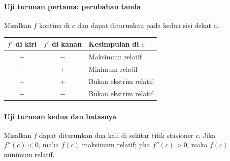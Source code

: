 \documentclass{../../kalkulus-ppt}
\begin{document}
\begin{frame}
\frametitle{\insertsection}
\framesubtitle{Uji turunan pertama: perubahan tanda}

\begin{teorema}
Misalkan $f$ kontinu di $c$ dan dapat diturunkan pada kedua sisi dekat $c$.
\begin{center}\begin{tabular}{c|c|l}
$f'$ di kiri&$f'$ di kanan&Kesimpulan di $c$\\\hline
$+$&$-$&Maksimum relatif\\
$-$&$+$&Minimum relatif\\
$+$&$+$&Bukan ekstrim relatif\\
$-$&$-$&Bukan ekstrim relatif
\end{tabular}\end{center}\end{teorema}
\end{frame}

\begin{frame}
\frametitle{\insertsection}
\framesubtitle{Uji turunan kedua dan batasnya}

\begin{teorema}
Misalkan $f$ dapat diturunkan dua kali di sekitar titik stasioner $c$. Jika $f''(c)<0$, maka $f(c)$ maksimum relatif; jika $f''(c)>0$, maka $f(c)$ minimum relatif.
\end{teorema}
\end{frame}
\end{document}
